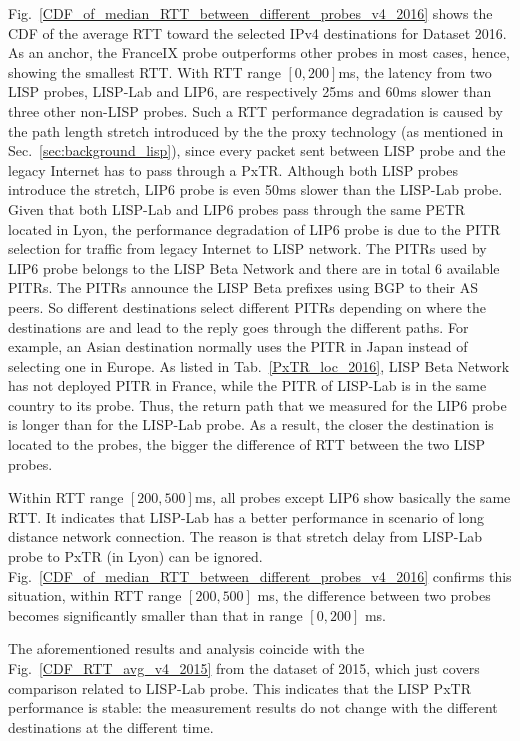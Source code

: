 Fig.~\ref{CDF_of_median_RTT_between_different_probes_v4_2016} shows the CDF of the average RTT toward the selected IPv4 destinations for Dataset 2016. %
As an anchor, the FranceIX probe outperforms other probes in most cases, hence, showing the smallest RTT. With RTT range $[0, 200]$ms, the latency from two LISP probes, LISP-Lab and LIP6, are respectively 25ms and 60ms slower than three other non-LISP probes. Such a RTT performance degradation is caused by the path length stretch introduced by the the proxy technology (as mentioned in Sec.~\ref{sec:background_lisp}), since every packet sent between LISP probe and the legacy Internet has to pass through a PxTR. Although both LISP probes introduce the stretch, LIP6 probe is even 50ms slower than the LISP-Lab probe. Given that both LISP-Lab and LIP6 probes pass through the same PETR located in Lyon, the performance degradation of LIP6 probe is due to the PITR selection for traffic from legacy Internet to LISP network. The PITRs used by LIP6 probe belongs to the LISP Beta Network and there are in total 6 available PITRs. The PITRs announce the LISP Beta prefixes using BGP to their AS peers. So different destinations select different PITRs depending on where the destinations are and lead to the reply goes through the different paths. For example, an Asian destination normally uses the PITR in Japan instead of selecting one in Europe. As listed in Tab.~\ref{PxTR_loc_2016}, LISP Beta Network has not deployed PITR in France, while the PITR of LISP-Lab is in the same country to its probe. Thus, the return path that we measured for the LIP6 probe is longer than for the LISP-Lab probe. As a result, the closer the destination is located to the probes, the bigger the difference of RTT between the two LISP probes.

Within RTT range $[200, 500]$ms, all probes except LIP6 show basically the same RTT. It indicates that LISP-Lab has a better performance in scenario of long distance network connection. The reason is that stretch delay from LISP-Lab probe to PxTR (in Lyon) can be ignored. Fig.~\ref{CDF_of_median_RTT_between_different_probes_v4_2016} confirms this situation, within RTT range $[200, 500]$ ms, the difference between two probes becomes significantly smaller than that in range $[0, 200]$ ms.

The aforementioned results and analysis coincide with the Fig.~\ref{CDF_RTT_avg_v4_2015} from the dataset of 2015, which just covers comparison related to LISP-Lab probe. This indicates that the LISP PxTR performance is stable: the measurement results do not change with the different destinations at the different time. 

